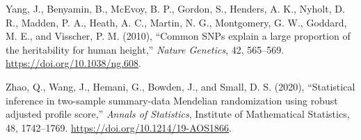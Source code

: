 \documentclass[
]{article}
\theoremstyle{plain}
\begin{document}
\leavevmode\hypertarget{ref-yang_common_2010}{}%
Yang, J., Benyamin, B., McEvoy, B. P., Gordon, S., Henders, A. K., Nyholt, D. R., Madden, P. A., Heath, A. C., Martin, N. G., Montgomery, G. W., Goddard, M. E., and Visscher, P. M. (2010), ``Common SNPs explain a large proportion of the heritability for human height,'' \emph{Nature Genetics}, 42, 565--569. \url{https://doi.org/10.1038/ng.608}.

\leavevmode\hypertarget{ref-zhao_statistical_2020}{}%
Zhao, Q., Wang, J., Hemani, G., Bowden, J., and Small, D. S. (2020), ``Statistical inference in two-sample summary-data Mendelian randomization using robust adjusted profile score,'' \emph{Annals of Statistics}, Institute of Mathematical Statistics, 48, 1742--1769. \url{https://doi.org/10.1214/19-AOS1866}.
\end{document}
